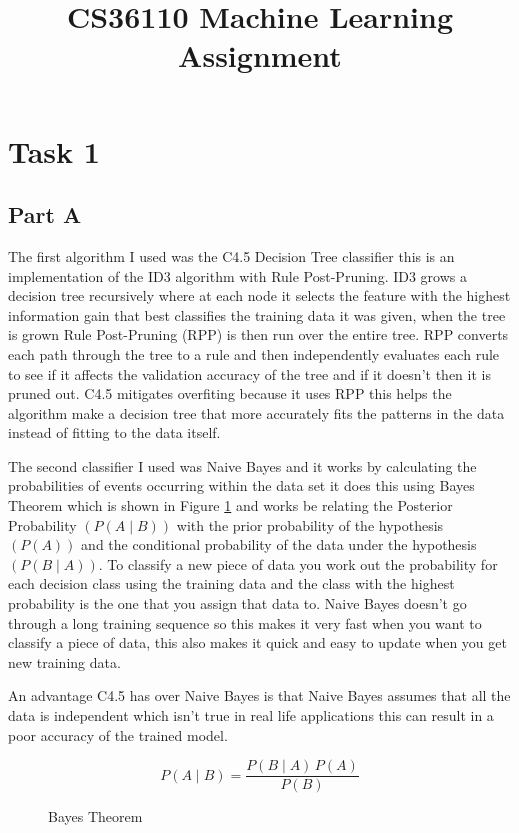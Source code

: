 \documentclass[10pt]{article}
\title {CS36110 Machine Learning Assignment}
\date{}                                           %
\begin{document}
\maketitle

\section*{Task 1}

\subsection*{Part A}
The first algorithm I used was the C4.5 Decision Tree classifier this is an implementation of the ID3 algorithm with Rule Post-Pruning. ID3 grows a decision tree recursively where at each node it selects the feature with the highest information gain that best classifies the training data it was given, when the tree is grown Rule Post-Pruning (RPP) is then run over the entire tree. RPP converts each path through the tree to a rule and then independently evaluates each rule to see if it affects the validation accuracy of the tree and if it doesn't then it is pruned out. C4.5 mitigates overfiting because it uses RPP this helps the algorithm make a decision tree that more accurately fits the patterns in the data instead of fitting to the data itself.

The second classifier I used was Naive Bayes and it works by calculating the probabilities of events occurring within the data set it does this using Bayes Theorem which is shown in Figure \ref{fig:bayes} and works be relating the Posterior Probability $(P(A \mid B))$ with the prior probability of the hypothesis $(P(A))$ and the conditional probability of the data under the hypothesis $(P(B \mid A))$. To classify a new piece of data you work out the probability for each decision class using the training data and the class with the highest probability is the one that you assign that data to. Naive Bayes doesn't go through a long training sequence so this makes it very fast when you want to classify a piece of data, this also makes it quick and easy to update when you get new training data.

An advantage C4.5 has over Naive Bayes is that Naive Bayes assumes that all the data is independent which isn't true in real life applications this can result in a poor accuracy of the trained model.


\begin{figure}[h]
    \centering
    $$ P(A \mid B) = \frac{P(B \mid A) \, P(A)}{P(B)} $$
    \caption{Bayes Theorem}
    \label{fig:bayes}
\end{figure}
\end{document}
